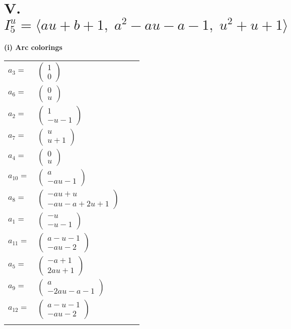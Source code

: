 \documentclass[1p]{elsarticle_modified}
\theoremstyle{definition}
\begin{document}
\centering \section*{V. $I^u_{5}= \langle a u+b+1,\;a^2- a u- a-1,\;u^2+u+1 \rangle$}
\flushleft \textbf{(i) Arc colorings}\\
\begin{tabular}{m{7pt} m{180pt} m{7pt} m{180pt} }
\flushright $a_{3}=$&$\begin{pmatrix}1\\0\end{pmatrix}$ \\
\flushright $a_{6}=$&$\begin{pmatrix}0\\u\end{pmatrix}$ \\
\flushright $a_{2}=$&$\begin{pmatrix}1\\- u-1\end{pmatrix}$ \\
\flushright $a_{7}=$&$\begin{pmatrix}u\\u+1\end{pmatrix}$ \\
\flushright $a_{4}=$&$\begin{pmatrix}0\\u\end{pmatrix}$ \\
\flushright $a_{10}=$&$\begin{pmatrix}a\\- a u-1\end{pmatrix}$ \\
\flushright $a_{8}=$&$\begin{pmatrix}- a u+u\\- a u- a+2 u+1\end{pmatrix}$ \\
\flushright $a_{1}=$&$\begin{pmatrix}- u\\- u-1\end{pmatrix}$ \\
\flushright $a_{11}=$&$\begin{pmatrix}a- u-1\\- a u-2\end{pmatrix}$ \\
\flushright $a_{5}=$&$\begin{pmatrix}- a+1\\2 a u+1\end{pmatrix}$ \\
\flushright $a_{9}=$&$\begin{pmatrix}a\\-2 a u- a-1\end{pmatrix}$ \\
\flushright $a_{12}=$&$\begin{pmatrix}a- u-1\\- a u-2\end{pmatrix}$\\&\end{tabular}
\end{document}
